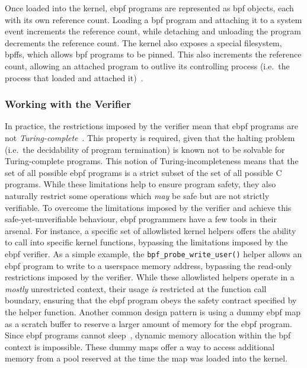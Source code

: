 Once loaded into the kernel, \gls{ebpf} programs are represented as \gls{bpf} objects, each with its
own reference count. Loading a \gls{bpf} program and attaching it to a system event increments
the reference count, while detaching and unloading the program decrements the reference
count. The kernel also exposes a special filesystem, \gls{bpffs}, which allows \gls{bpf}
programs to be pinned. This also increments the reference count, allowing an attached
program to outlive its controlling process (i.e.~the process that loaded and attached
it)~\cite{gregg2019_bpf}.

\subsubsection*{Working with the Verifier}

In practice, the restrictions imposed by the verifier mean that \gls{ebpf} programs are not
\textit{Turing-complete}~\cite{gregg2019_bpf}.  This property is required, given that the
halting problem (i.e.~the decidability of program termination) is known not to be solvable
for Turing-complete programs. This notion of Turing-incompleteness means that the set of
all possible \gls{ebpf} programs is a strict subset of the set of all possible C programs. While
these limitations help to ensure program safety, they also naturally restrict some
operations which \textit{may} be safe but are not strictly verifiable. To overcome the
limitations imposed by the verifier and achieve this safe-yet-unverifiable behaviour, \gls{ebpf}
programmers have a few tools in their arsenal. For instance, a specific set of allowlisted
kernel helpers offers the ability to call into specific kernel functions, bypassing the
limitations imposed by the \gls{ebpf} verifier. As a simple example, the
\texttt{bpf\_probe\_write\_user()} helper allows an \gls{ebpf} program to write to a userspace
memory address, bypassing the read-only restrictions imposed by the verifier. While these
allowlisted helpers operate in a \textit{mostly} unrestricted context, their usage
\textit{is} restricted at the function call boundary, ensuring that the \gls{ebpf} program obeys
the safety contract specified by the helper function.  Another common design pattern is
using a dummy \gls{ebpf} map as a scratch buffer to reserve a larger amount of memory for the
\gls{ebpf} program.  Since \gls{ebpf} programs cannot sleep~\cite{gregg2019_bpf}, dynamic memory
allocation within the \gls{bpf} context is impossible. These dummy maps offer a way to access
additional memory from a pool reserved at the time the map was loaded into the kernel.

